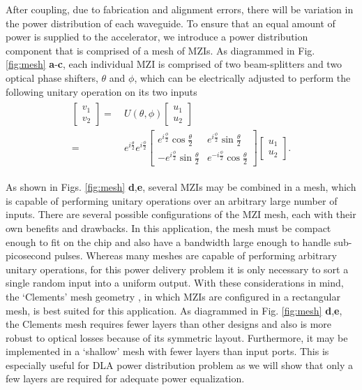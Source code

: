 \begin{figure}
\end{figure}

After coupling, due to fabrication and alignment errors, there will be variation in the power distribution of each waveguide. To ensure that an equal amount of power is supplied to the accelerator, we introduce a power distribution component that is comprised of a mesh of MZIs.  As diagrammed in Fig. \ref{fig:mesh} \textbf{a}-\textbf{c}, each individual MZI is comprised of two beam-splitters and two optical phase shifters, $\theta$ and $\phi$, which can be electrically adjusted to perform the following unitary operation on its two inputs \cite{reck_experimental_1994,clements_optimal_2016,shen_deep_2017,pai2018matrix}
\begin{align}
\begin{split}
    \begin{bmatrix}
      v_1 \\ v_2
    \end{bmatrix}
    =&~U(\theta, \phi) 
    \begin{bmatrix}
      u_1 \\ u_2
    \end{bmatrix}
    \\
    =&~e^{i\frac{\theta}{2}} e^{i\frac{\phi}{2}}
    \begin{bmatrix}
      e^{i\frac{\phi}{2}}\cos{\frac{\theta}{2}} &
      e^{i\frac{\phi}{2}}\sin{\frac{\theta}{2}} \\
      - e^{i\frac{\phi}{2}}\sin{\frac{\theta}{2}} & 
      e^{-i\frac{\phi}{2}}\cos{\frac{\theta}{2}}
    \end{bmatrix}
    \begin{bmatrix}
      u_1 \\ u_2
    \end{bmatrix}.
\end{split}
\label{eq:U}
\end{align}
%

As shown in Figs. \ref{fig:mesh} \textbf{d},\textbf{e}, several MZIs may be combined in a mesh, which is capable of performing unitary operations over an arbitrary large number of inputs.  There are several possible configurations of the MZI mesh, each with their own benefits and drawbacks.  In this application, the mesh must be compact enough to fit on the chip and also have a bandwidth large enough to handle sub-picosecond pulses.  Whereas many meshes are capable of performing arbitrary unitary operations, for this power delivery problem it is only necessary to sort a single random input into a uniform output.  With these considerations in mind, the `Clements' mesh geometry \cite{clements_optimal_2016}, in which MZIs are configured in a rectangular mesh, is best suited for this application.   As diagrammed in Fig. \ref{fig:mesh} \textbf{d},\textbf{e}, the Clements mesh requires fewer layers than other designs \cite{reck_experimental_1994} and also is more robust to optical losses because of its symmetric layout.  Furthermore, it may be implemented in a `shallow' mesh with fewer layers than input ports.  This is especially useful for DLA power distribution problem as we will show that only a few layers are required for adequate power equalization.  %


